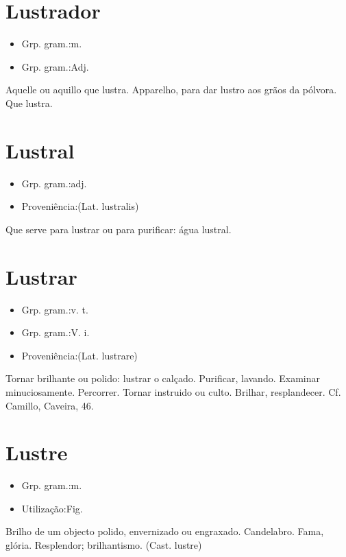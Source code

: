 \section{Lustrador}
\begin{itemize}
\item {Grp. gram.:m.}
\end{itemize}
\begin{itemize}
\item {Grp. gram.:Adj.}
\end{itemize}
Aquelle ou aquillo que lustra.
Apparelho, para dar lustro aos grãos da pólvora.
Que lustra.
\section{Lustral}
\begin{itemize}
\item {Grp. gram.:adj.}
\end{itemize}
\begin{itemize}
\item {Proveniência:(Lat. \textunderscore lustralis\textunderscore )}
\end{itemize}
Que serve para lustrar ou para purificar: \textunderscore água lustral\textunderscore .
\section{Lustrar}
\begin{itemize}
\item {Grp. gram.:v. t.}
\end{itemize}
\begin{itemize}
\item {Grp. gram.:V. i.}
\end{itemize}
\begin{itemize}
\item {Proveniência:(Lat. \textunderscore lustrare\textunderscore )}
\end{itemize}
Tornar brilhante ou polido: \textunderscore lustrar o calçado\textunderscore .
Purificar, lavando.
Examinar minuciosamente.
Percorrer.
Tornar instruido ou culto.
Brilhar, resplandecer. Cf. Camillo, \textunderscore Caveira\textunderscore , 46.
\section{Lustre}
\begin{itemize}
\item {Grp. gram.:m.}
\end{itemize}
\begin{itemize}
\item {Utilização:Fig.}
\end{itemize}
Brilho de um objecto polido, envernizado ou engraxado.
Candelabro.
Fama, glória.
Resplendor; brilhantismo.
(Cast. \textunderscore lustre\textunderscore )
